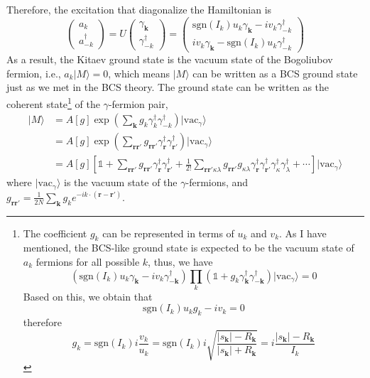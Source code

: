 \documentclass[12font]{article}
\numberwithin{equation}{section}    %
\theoremstyle{definition}
\newcommand{\vac}{\mrm{vac}}
\newcommand{\ket}[1]{| #1 \rangle}
\newcommand{\lr}[1]{\left(  #1  \right)}
\newcommand{\lrm}[1]{\left[  #1  \right]}
\newcommand{\abs}[1]{\left|  #1  \right|}
\newcommand{\mrm}[1]{\mathrm{#1}}
\newcommand{\bo}[1]{\mathbf{#1}}
\begin{document}
Therefore, the excitation that diagonalize the Hamiltonian is 
\begin{equation}\label{Bogo.e}
\begin{pmatrix}
    a_k \\
    a_{-k}^\dagger 
  \end{pmatrix} = U\begin{pmatrix}
                     \gamma_{\bo{k}} \\
                     \gamma^\dagger_{-k} 
                   \end{pmatrix} = \begin{pmatrix}
                                     \mrm{sgn}(I_k) u_k\gamma_{\bo{k}} - iv_k\gamma^\dagger_{-k} \\
                                     i v_k\gamma_{\bo{k}} - \mrm{sgn}(I_k) u_k\gamma^\dagger_{-k} 
                                   \end{pmatrix}
\end{equation}
As a result, the Kitaev ground state is the vacuum state of the Bogoliubov fermion, i.e., $a_{k}\ket{M} = 0$, which means $\ket{M}$ can be written as a BCS ground state just as we met in the BCS theory. The ground state can be written as the coherent state\footnote{
The coefficient $g_k$ can be represented in terms of $u_k$ and $v_k$. As I have mentioned, the BCS-like ground state is expected to be the vacuum state of $a_k$ fermions for all possible $k$, thus, we have
\[
\lr{\mrm{sgn}(I_k) u_k\gamma_{\bo{k}} - iv_k\gamma_{-\bo{k}}^\dagger}\prod_{k}\lr{\mathds{1} + g_k\gamma_{\bo{k}}^\dagger \gamma_{-\bo{k}}^\dagger}\ket{\vac_\gamma} = 0
\]
Based on this, we obtain that 
\[\mrm{sgn}(I_k) u_kg_k - iv_k = 0\]
therefore
\begin{equation}\label{g_k solution.e}
  g_k = \mrm{sgn}(I_k)i\frac{v_k}{u_k} = \mrm{sgn}(I_k) i\sqrt{\frac{\abs{s_{\bo{k}}} - R_{\bo{k}}}{\abs{s_{\bo{k}}} + R_{\bo{k}}}} = i\frac{\abs{s_{\bo{k}}} - R_{\bo{k}}}{I_k}
\end{equation}
} of the $\gamma$-fermion pair,
\begin{align*}
  \ket{M} &= A\lrm{g}\exp\lr{\sum_{\bo{k}}g_k \gamma^\dagger_k \gamma^\dagger_{-k}}\ket{\vac_\gamma}\\
   &= A\lrm{g}\exp\lr{\sum_{{\bo{r}}{\bo{r}'}}g_{{\bo{r}}{\bo{r}'}} \gamma^\dagger_{\bo{r}} \gamma^\dagger_{{\bo{r}'}}}\ket{\vac_\gamma}\\
   &= A\lrm{g}\lrm{\mathds{1} + \sum_{{\bo{r}}{\bo{r}'}}g_{{\bo{r}}{\bo{r}'}} \gamma^\dagger_{\bo{r}} \gamma^\dagger_{{\bo{r}'}} + \frac{1}{2!}\sum_{{\bo{r}}{\bo{r}'}\kappa\lambda}g_{{\bo{r}}{\bo{r}'}}g_{\kappa\lambda
   } \gamma^\dagger_{\bo{r}} \gamma^\dagger_{{\bo{r}'}}\gamma^\dagger_\kappa \gamma^\dagger_{\lambda} + \cdots}\ket{\vac_\gamma}
\end{align*}
where $\ket{\vac_\gamma}$ is the vacuum state of the $\gamma$-fermions, and $g_{{\bo{r}}{\bo{r}'}} = \frac{1}{2N}\sum_{\bo{k}}g_ke^{-ik\cdot(\bo{r}-\bo{r}')}$. 
\end{document}

